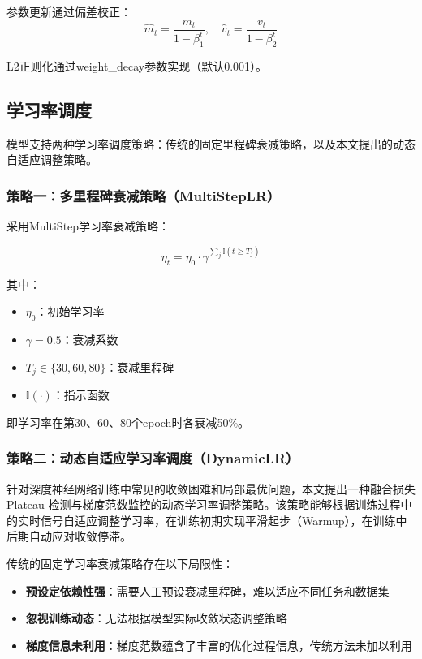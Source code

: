 参数更新通过偏差校正：
\begin{equation}
\hat{m}_t = \frac{m_t}{1 - \beta_1^t}, \quad \hat{v}_t = \frac{v_t}{1 - \beta_2^t}
\end{equation}

L2正则化通过weight\_decay参数实现（默认0.001）。

\subsection{学习率调度}

模型支持两种学习率调度策略：传统的固定里程碑衰减策略，以及本文提出的动态自适应调整策略。

\subsubsection{策略一：多里程碑衰减策略（MultiStepLR）}

采用MultiStep学习率衰减策略：

\begin{equation}
\eta_t = \eta_0 \cdot \gamma^{\sum_{j} \mathbb{I}(t \geq T_j)}
\end{equation}

其中：
\begin{itemize}
    \item $\eta_0$：初始学习率
    \item $\gamma = 0.5$：衰减系数
    \item $T_j \in \{30, 60, 80\}$：衰减里程碑
    \item $\mathbb{I}(\cdot)$：指示函数
\end{itemize}

即学习率在第30、60、80个epoch时各衰减50\%。

\subsubsection{策略二：动态自适应学习率调度（DynamicLR）}

针对深度神经网络训练中常见的收敛困难和局部最优问题，本文提出一种融合损失 Plateau 检测与梯度范数监控的动态学习率调整策略。该策略能够根据训练过程中的实时信号自适应调整学习率，在训练初期实现平滑起步（Warmup），在训练中后期自动应对收敛停滞。


传统的固定学习率衰减策略存在以下局限性：

\begin{itemize}
    \item \textbf{预设定依赖性强}：需要人工预设衰减里程碑，难以适应不同任务和数据集
    \item \textbf{忽视训练动态}：无法根据模型实际收敛状态调整策略
    \item \textbf{梯度信息未利用}：梯度范数蕴含了丰富的优化过程信息，传统方法未加以利用
\end{itemize}

